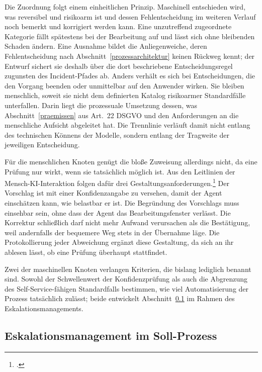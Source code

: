 Die Zuordnung folgt einem einheitlichen Prinzip. Maschinell entschieden wird, was reversibel und risikoarm ist und dessen Fehlentscheidung im weiteren Verlauf noch bemerkt und korrigiert werden kann. Eine unzutreffend zugeordnete Kategorie f\"allt sp\"atestens bei der Bearbeitung auf und l\"asst sich ohne bleibenden Schaden \"andern. Eine Ausnahme bildet die Anliegenweiche, deren Fehlentscheidung nach Abschnitt~\ref{prozessarchitektur} keinen R\"uckweg kennt; der Entwurf sichert sie deshalb \"uber die dort beschriebene Entscheidungsregel zugunsten des Incident-Pfades ab. Anders verh\"alt es sich bei Entscheidungen, die den Vorgang beenden oder unmittelbar auf den Anwender wirken. Sie bleiben menschlich, soweit sie nicht dem definierten Katalog risikoarmer Standardf\"alle unterfallen. Darin liegt die prozessuale Umsetzung dessen, was Abschnitt~\ref{praemissen} aus Art.~22 DSGVO und den Anforderungen an die menschliche Aufsicht abgeleitet hat. Die Trennlinie verl\"auft damit nicht entlang des technischen K\"onnens der Modelle, sondern entlang der Tragweite der jeweiligen Entscheidung.

F\"ur die menschlichen Knoten gen\"ugt die blo{\ss}e Zuweisung allerdings nicht, da eine Pr\"ufung nur wirkt, wenn sie tats\"achlich m\"oglich ist. Aus den Leitlinien der Mensch-KI-Interaktion folgen daf\"ur drei Gestaltungsanforderungen.\footcite[Vgl.][S.~3]{Amershi2019} Der Vorschlag ist mit einer Konfidenzangabe zu versehen, damit der Agent einsch\"atzen kann, wie belastbar er ist. Die Begr\"undung des Vorschlags muss einsehbar sein, ohne dass der Agent das Bearbeitungsfenster verl\"asst. Die Korrektur schlie{\ss}lich darf nicht mehr Aufwand verursachen als die Best\"atigung, weil andernfalls der bequemere Weg stets in der \"Ubernahme l\"age. Die Protokollierung jeder Abweichung erg\"anzt diese Gestaltung, da sich an ihr ablesen l\"asst, ob eine Pr\"ufung \"uberhaupt stattfindet.

Zwei der maschinellen Knoten verlangen Kriterien, die bislang lediglich benannt sind. Sowohl der Schwellenwert der Konfidenzpr\"ufung als auch die Abgrenzung des Self-Service-f\"ahigen Standardfalls bestimmen, wie viel Automatisierung der Prozess tats\"achlich zul\"asst; beide entwickelt Abschnitt~\ref{eskalationSoll} im Rahmen des Eskalationsmanagements.

\subsection{Eskalationsmanagement im Soll-Prozess}
\label{eskalationSoll}

